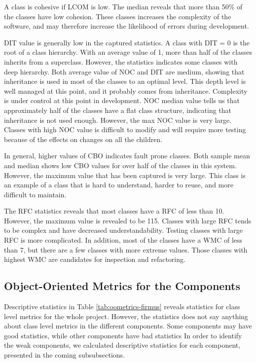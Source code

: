 A class is cohesive if LCOM is low. The median reveals that more than 50\% of the classes have low cohesion. These classes increases the complexity of the software, and may therefore increase the likelihood of errors during development. 

DIT value is generally low in the captured statistics. A class with DIT = 0 is the root of a class hierarchy. With an average value of 1, more than half of the classes inherits from a superclass. However, the statistics indicates some classes with deep hierarchy. Both average value of NOC and DIT are medium, showing that inheritance is used in most of the classes to an optimal level. This depth level is well managed at this point, and it probably comes from inheritance. Complexity is under control at this point in development. NOC median value tells us that approximately half of the classes have a flat class structure, indicating that inheritance is not used enough. However, the max NOC value is very large. Classes with high NOC value is difficult to modify and will require more testing because of the effects on changes on all the children. 

In general, higher values of CBO indicates fault prone classes. Both sample mean and median shows low CBO values for over half of the classes in this system. However, the maximum value that has been captured is very large. This class is an example of a class that is hard to understand, harder to reuse, and more difficult to maintain. 

The RFC statistics reveals that most classes have a RFC of less than 10. However, the maximum value is revealed to be 115. Classes with large RFC tends to be complex and have decreased understandability. Testing classes with large RFC is more complicated. In addition, most of the classes have a WMC of less than 7, but there are a few classes with more extreme values. Those classes with highest WMC are candidates for inspection and refactoring. 



\subsection{Object-Oriented Metrics for the Components}
Descriptive statistics in Table \ref{tab:oometrics-firmus} reveals statistics for class level metrics for the whole project. However, the statistics does not say anything about class level metrics in the different components. Some components may have good statistics, while other components have bad statistics In order to identify the weak components, we calculated descriptive statistics for each component, presented in the coming subsubsections. 

